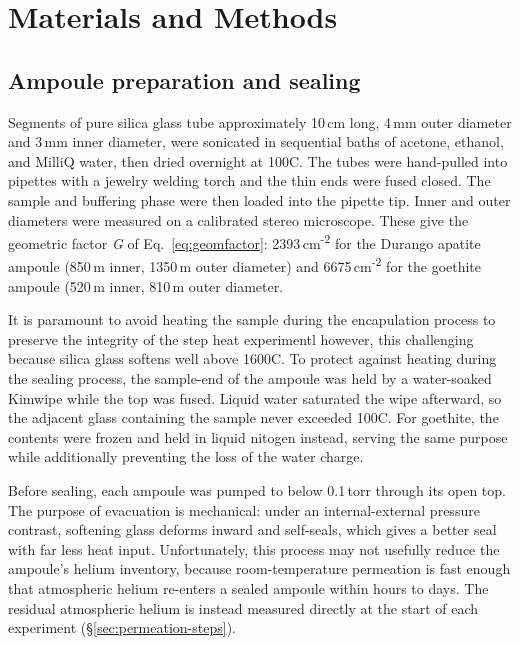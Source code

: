 \section{Materials and Methods}\label{sec:methods}

\subsection{Ampoule preparation and sealing}\label{sec:ampoule-prep}

Segments of pure silica glass tube approximately 10\,cm long, 4\,mm outer diameter and 3\,mm inner diameter, were sonicated in sequential baths of acetone, ethanol, and MilliQ water, then dried overnight at 100\textdegree C. The tubes were hand-pulled into pipettes with a jewelry welding torch and the thin ends were fused closed. The sample and buffering phase were then loaded into the pipette tip. Inner and outer diameters were measured on a calibrated stereo microscope. These give the geometric factor \emph{G} of Eq.~\eqref{eq:geomfactor}: 2393\,cm\textsuperscript{-2} for the Durango apatite ampoule (850\,\textmu m inner, 1350\,\textmu m outer diameter) and 6675\,cm\textsuperscript{-2} for the goethite ampoule (520\,\textmu m inner, 810\,\textmu m outer diameter.

It is paramount to avoid heating the sample during the encapulation process to preserve the integrity of the step heat experimentl however, this challenging because silica glass softens well above 1600\textdegree C. To protect against heating during the sealing process, the sample-end of the ampoule was held by a water-soaked Kimwipe while the top was fused. Liquid water saturated the wipe afterward, so the adjacent glass containing the sample never exceeded 100\textdegree C. For goethite, the contents were frozen and held in liquid nitogen instead, serving the same purpose while additionally preventing the loss of the water charge.

Before sealing, each ampoule was pumped to below 0.1\,torr through its open top. The purpose of evacuation is mechanical: under an internal-external pressure contrast, softening glass deforms inward and self-seals, which gives a better seal with far less heat input. Unfortunately, this process may not usefully reduce the ampoule's helium inventory, because room-temperature permeation is fast enough that atmospheric helium re-enters a sealed ampoule within hours to days. The residual atmospheric helium is instead measured directly at the start of each experiment (\S\ref{sec:permeation-steps}).

